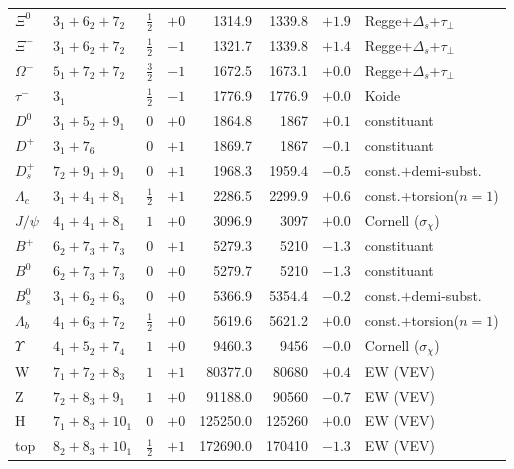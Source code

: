 \documentclass[11pt]{article}
\begin{document}
\begin{center}
\begin{longtable}{@{}llccrrrl@{}}
$\Xi^0$ & $3_{1}{+}6_{2}{+}7_{2}$ & $\tfrac12$ & $+0$ & 1314.9 & 1339.8 & $+1.9$ & Regge+$\Delta_s$+$\tau_\perp$ \\
$\Xi^-$ & $3_{1}{+}6_{2}{+}7_{2}$ & $\tfrac12$ & $-1$ & 1321.7 & 1339.8 & $+1.4$ & Regge+$\Delta_s$+$\tau_\perp$ \\
$\Omega^-$ & $5_{1}{+}7_{2}{+}7_{2}$ & $\tfrac32$ & $-1$ & 1672.5 & 1673.1 & $+0.0$ & Regge+$\Delta_s$+$\tau_\perp$ \\
$\tau^-$ & $3_{1}$ & $\tfrac12$ & $-1$ & 1776.9 & 1776.9 & $+0.0$ & Koide \\
$D^0$ & $3_{1}{+}5_{2}{+}9_{1}$ & $0$ & $+0$ & 1864.8 & 1867 & $+0.1$ & constituant \\
$D^+$ & $3_{1}{+}7_{6}$ & $0$ & $+1$ & 1869.7 & 1867 & $-0.1$ & constituant \\
$D_s^+$ & $7_{2}{+}9_{1}{+}9_{1}$ & $0$ & $+1$ & 1968.3 & 1959.4 & $-0.5$ & const.$+$demi-subst. \\
$\Lambda_c$ & $3_{1}{+}4_{1}{+}8_{1}$ & $\tfrac12$ & $+1$ & 2286.5 & 2299.9 & $+0.6$ & const.+torsion($n{=}1$) \\
$J/\psi$ & $4_{1}{+}4_{1}{+}8_{1}$ & $1$ & $+0$ & 3096.9 & 3097 & $+0.0$ & Cornell ($\sigma_\chi$) \\
$B^+$ & $6_{2}{+}7_{3}{+}7_{3}$ & $0$ & $+1$ & 5279.3 & 5210 & $-1.3$ & constituant \\
$B^0$ & $6_{2}{+}7_{3}{+}7_{3}$ & $0$ & $+0$ & 5279.7 & 5210 & $-1.3$ & constituant \\
$B_s^0$ & $3_{1}{+}6_{2}{+}6_{3}$ & $0$ & $+0$ & 5366.9 & 5354.4 & $-0.2$ & const.$+$demi-subst. \\
$\Lambda_b$ & $4_{1}{+}6_{3}{+}7_{2}$ & $\tfrac12$ & $+0$ & 5619.6 & 5621.2 & $+0.0$ & const.+torsion($n{=}1$) \\
$\Upsilon$ & $4_{1}{+}5_{2}{+}7_{4}$ & $1$ & $+0$ & 9460.3 & 9456 & $-0.0$ & Cornell ($\sigma_\chi$) \\
W & $7_{1}{+}7_{2}{+}8_{3}$ & $1$ & $+1$ & 80377.0 & 80680 & $+0.4$ & EW (VEV) \\
Z & $7_{2}{+}8_{3}{+}9_{1}$ & $1$ & $+0$ & 91188.0 & 90560 & $-0.7$ & EW (VEV) \\
H & $7_{1}{+}8_{3}{+}10_{1}$ & $0$ & $+0$ & 125250.0 & 125260 & $+0.0$ & EW (VEV) \\
top & $8_{2}{+}8_{3}{+}10_{1}$ & $\tfrac12$ & $+1$ & 172690.0 & 170410 & $-1.3$ & EW (VEV) \\
\bottomrule
\end{longtable}
\end{center}
\end{document}
